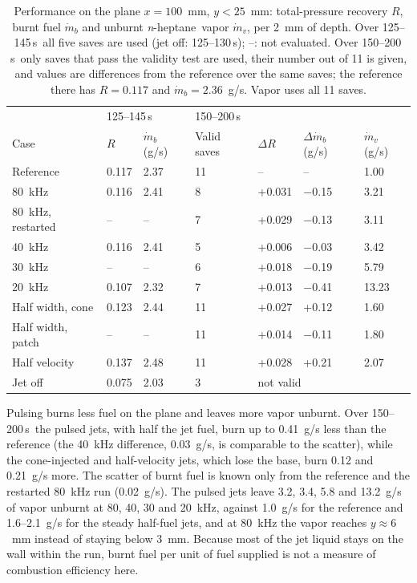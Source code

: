 \documentclass[aip,pof,preprint,amsmath,amssymb]{revtex4-2}
\newcommand{\us}{\,\textmu s}
\newcommand{\nh}{\textit{n}-heptane}
\begin{document}
\begin{table}
\caption{Performance on the plane $x = 100$~mm, $y < 25$~mm: total-pressure recovery $R$, burnt fuel $\dot m_b$ and unburnt \nh\ vapor $\dot m_v$, per 2~mm of depth. Over 125--145\us\ all five saves are used (jet off: 125--130\us); --: not evaluated. Over 150--200\us\ only saves that pass the validity test are used, their number out of 11 is given, and values are differences from the reference over the same saves; the reference there has $R = 0.117$ and $\dot m_b = 2.36$~g/s. Vapor uses all 11 saves.}\label{tab:performance}
\footnotesize
\begin{tabular}{@{}lllllll@{}}
\toprule
 & \multicolumn{2}{l}{125--145\us} & \multicolumn{4}{l}{150--200\us}\\
Case & $R$ & $\dot m_b$ (g/s) & Valid saves & $\Delta R$ & $\Delta \dot m_b$ (g/s) & $\dot m_v$ (g/s)\\
\midrule
Reference & 0.117 & 2.37 & 11 & -- & -- & 1.00\\
80~kHz & 0.116 & 2.41 & 8 & +0.031 & $-$0.15 & 3.21\\
80~kHz, restarted & -- & -- & 7 & +0.029 & $-$0.13 & 3.11\\
40~kHz & 0.116 & 2.41 & 5 & +0.006 & $-$0.03 & 3.42\\
30~kHz & -- & -- & 6 & +0.018 & $-$0.19 & 5.79\\
20~kHz & 0.107 & 2.32 & 7 & +0.013 & $-$0.41 & 13.23\\
Half width, cone & 0.123 & 2.44 & 11 & +0.027 & +0.12 & 1.60\\
Half width, patch & -- & -- & 11 & +0.014 & $-$0.11 & 1.80\\
Half velocity & 0.137 & 2.48 & 11 & +0.028 & +0.21 & 2.07\\
Jet off & 0.075 & 2.03 & 3 & \multicolumn{3}{l}{not valid}\\
\bottomrule
\end{tabular}
\end{table}

Pulsing burns less fuel on the plane and leaves more vapor unburnt. Over 150--200\us\ the pulsed jets, with half the jet fuel, burn up to 0.41~g/s less than the reference (the 40~kHz difference, 0.03~g/s, is comparable to the scatter), while the cone-injected and half-velocity jets, which lose the base, burn 0.12 and 0.21~g/s more. The scatter of burnt fuel is known only from the reference and the restarted 80~kHz run (0.02~g/s). The pulsed jets leave 3.2, 3.4, 5.8 and 13.2~g/s of vapor unburnt at 80, 40, 30 and 20~kHz, against 1.0~g/s for the reference and 1.6--2.1~g/s for the steady half-fuel jets, and at 80~kHz the vapor reaches $y \approx 6$~mm instead of staying below 3~mm. Because most of the jet liquid stays on the wall within the run, burnt fuel per unit of fuel supplied is not a measure of combustion efficiency here.
\end{document}
